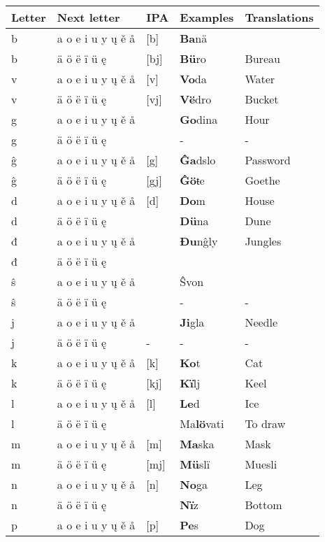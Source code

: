 \begin{longtable}{lllll}
		Letter & Next letter & IPA & Examples & Translations \\
		\endhead
		b & a o e i u y ų ě å & [b] & \textbf{Ba}nä & \\
		b & ä ö ë ï ü ę & [bj] & \textbf{Bü}ro & Bureau\\
		v & a o e i u y ų ě å & [v] & \textbf{Vo}da & Water \\
		v & ä ö ë ï ü ę & [vj] & \textbf{Vë}dro & Bucket \\
		g & a o e i u y ų ě å & \textipa{[H]} & \textbf{Go}dina & Hour \\
		g & ä ö ë ï ü ę & \textipa{[Hj]} & - & - \\
		ĝ & a o e i u y ų ě å & [g] & \textbf{Ĝa}dslo & Password \\
		ĝ & ä ö ë ï ü ę & [gj] & \textbf{Ĝö}ŧe & Goethe \\
		d & a o e i u y ų ě å & [d] & \textbf{Do}m & House \\
		d & ä ö ë ï ü ę & \textipa{[\textbardotlessj]} & \textbf{Dü}na & Dune \\	
		đ & a o e i u y ų ě å & \textipa{[\t{\:d\:z}]} & \textbf{Đu}nĝly & Jungles \\
		đ & ä ö ë ï ü ę & \textipa{[\t{dZ}]} &  &  \\
		ŝ & a o e i u y ų ě å & \textipa{[\t{dz}]} & Ŝvon &  \\
		ŝ & ä ö ë ï ü ę & \textipa{[\t{dzj}]} & - & - \\
		j & a o e i u y ų ě å & \textipa{[J]} & \textbf{Ji}gla & Needle \\  
		j & ä ö ë ï ü ę & - & - & - \\
		k & a o e i u y ų ě å & [k] & \textbf{Ko}t & Cat \\  
		k & ä ö ë ï ü ę & [kj] & \textbf{Kï}lj & Keel \\ 
		l & a o e i u y ų ě å & [l] & \textbf{Le}d & Ice \\  
		l & ä ö ë ï ü ę & \textipa{[L]} & Ma\textbf{lö}vati & To draw \\ 
		m & a o e i u y ų ě å & [m] & \textbf{Ma}ska & Mask \\  
		m & ä ö ë ï ü ę & [mj] & \textbf{Mü}slï & Muesli \\
		n & a o e i u y ų ě å & [n] & \textbf{No}ga & Leg \\  
		n & ä ö ë ï ü ę & \textipa{[\textltailn]} & \textbf{Nï}z & Bottom \\
		p & a o e i u y ų ě å & [p] & \textbf{Pe}s & Dog \\  

\end{longtable}
